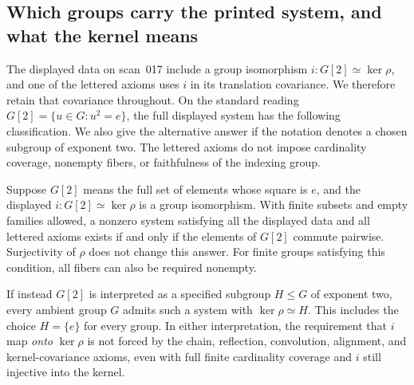 \subsection{Which groups carry the printed system, and what the kernel means}
The displayed data on scan~017 include a group isomorphism $i:G[2]\simeq\ker\rho$, and one of the lettered axioms uses $i$ in its translation covariance. We therefore retain that covariance throughout. On the standard reading $G[2]=\{u\in G:u^2=e\}$, the full displayed system has the following classification. We also give the alternative answer if the notation denotes a chosen subgroup of exponent two. The lettered axioms do not impose cardinality coverage, nonempty fibers, or faithfulness of the indexing group.

\begin{theorem}
\label{C:group-classification}
Suppose $G[2]$ means the full set of elements whose square is $e$, and the displayed $i:G[2]\simeq\ker\rho$ is a group isomorphism. With finite subsets and empty families allowed, a nonzero system satisfying all the displayed data and all lettered axioms exists if and only if the elements of $G[2]$ commute pairwise. Surjectivity of $\rho$ does not change this answer. For finite groups satisfying this condition, all fibers can also be required nonempty.

If instead $G[2]$ is interpreted as a specified subgroup $H\leq G$ of exponent two, every ambient group $G$ admits such a system with $\ker\rho\simeq H$. This includes the choice $H=\{e\}$ for every group. In either interpretation, the requirement that $i$ map \emph{onto} $\ker\rho$ is not forced by the chain, reflection, convolution, alignment, and kernel-covariance axioms, even with full finite cardinality coverage and $i$ still injective into the kernel.
\end{theorem}
